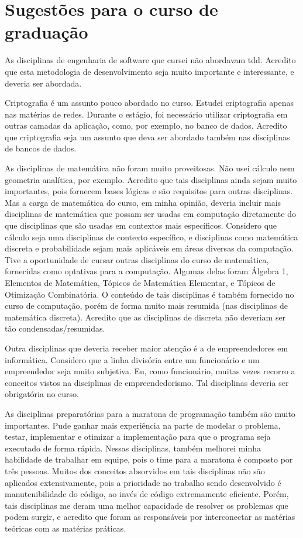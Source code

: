 
\section{Sugestões para o curso de graduação}

As disciplinas de engenharia de software que cursei não abordavam \gls{tdd}. Acredito que esta metodologia de desenvolvimento seja
muito importante e interessante, e deveria ser abordada.

Criptografia é um assunto pouco abordado no curso. Estudei criptografia apenas nas matérias de redes. Durante o estágio, foi necessário
utilizar criptografia em outras camadas da aplicação, como, por exemplo, no banco de dados. Acredito que criptografia seja um assunto
que deva ser abordado também nas disciplinas de bancos de dados.

As disciplinas de matemática não foram muito proveitosas. Não usei cálculo nem geometria analítica, por exemplo. 
Acredito que tais disciplinas ainda sejam muito importantes, pois fornecem bases lógicas e são requisitos para outras disciplinas. 
Mas a carga de matemática do curso, em minha opinião, deveria incluir mais disciplinas de matemática que possam ser usadas em computação 
diretamente do que disciplinas que são usadas em contextos mais específicos. Considero que cálculo seja uma disciplinas de contexto 
específico, e disciplinas como matemática discreta e probabilidade sejam mais aplicáveis em áreas diversas da computação. Tive a 
oportunidade de cursar outras disciplinas do curso de matemática, fornecidas como optativas para a computação. Algumas delas 
foram Álgebra 1, Elementos de Matemática, Tópicos de Matemática Elementar, e Tópicos de Otimização Combinatória. O conteúdo de 
tais disciplinas é também fornecido no curso de computação, porém de forma muito mais resumida (nas disciplinas de matemática discreta). 
Acredito que as disciplinas de discreta não deveriam ser tão condensadas/resumidas.

Outra disciplinas que deveria receber maior atenção é a de empreendedores em informática. Considero que a linha divisória entre um 
funcionário e um empreendedor seja muito subjetiva. Eu, como funcionário, muitas vezes recorro a conceitos vistos na disciplinas de 
empreendedorismo. Tal disciplinas deveria ser obrigatória no curso.

As disciplinas preparatórias para a maratona de programação também são muito importantes. Pude ganhar mais experiência 
na parte de modelar o problema, testar, implementar e otimizar a implementação para que o programa seja executado de forma rápida. 
Nessas disciplinas, também melhorei minha habilidade de trabalhar em equipe, pois o time para a maratona é composto por três pessoas. 
Muitos dos conceitos absorvidos em tais disciplinas não são aplicados extensivamente, pois a prioridade no trabalho sendo desenvolvido é 
manutenibilidade do código, ao invés de código extremamente eficiente. Porém, tais disciplinas me deram uma melhor capacidade de 
resolver os problemas que podem surgir, e acredito que foram as responsáveis por interconectar as matérias teóricas com as matérias práticas.

